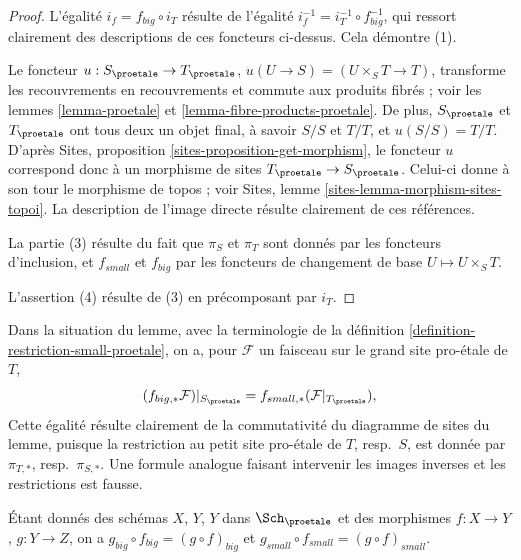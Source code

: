 \begin{proof}
L'égalité $i_f = f_{big} \circ i_T$ résulte de
l'égalité $i_f^{-1} = i_T^{-1} \circ f_{big}^{-1}$, qui ressort
clairement des descriptions de ces foncteurs ci-dessus.
Cela démontre (1).

\medskip\noindent
Le foncteur $u : S_\proetale \to T_\proetale$,
$u(U \to S) = (U \times_S T \to T)$,
transforme les recouvrements en recouvrements et commute aux produits fibrés ;
voir les lemmes \ref{lemma-proetale} et \ref{lemma-fibre-products-proetale}.
De plus, $S_\proetale$ et $T_\proetale$ ont tous deux un objet final,
à savoir $S/S$ et $T/T$, et $u(S/S) = T/T$. D'après
Sites, proposition \ref{sites-proposition-get-morphism},
le foncteur $u$ correspond donc à un morphisme de sites
$T_\proetale \to S_\proetale$. Celui-ci donne à son tour le
morphisme de topos ; voir
Sites, lemme \ref{sites-lemma-morphism-sites-topoi}. La description
de l'image directe résulte clairement de ces références.

\medskip\noindent
La partie (3) résulte du fait que $\pi_S$ et $\pi_T$ sont donnés par les
foncteurs d'inclusion, et $f_{small}$ et $f_{big}$ par les
foncteurs de changement de base $U \mapsto U \times_S T$.

\medskip\noindent
L'assertion (4) résulte de (3) en précomposant par $i_T$.
\end{proof}

\noindent
Dans la situation du lemme, avec la terminologie de la
définition \ref{definition-restriction-small-proetale},
on a, pour $\mathcal{F}$ un faisceau sur le grand site pro-\'etale de $T$,
\begin{equation}
\label{equation-compare-big-small}
(f_{big, *}\mathcal{F})|_{S_\proetale} =
f_{small, *}(\mathcal{F}|_{T_\proetale}),
\end{equation}
Cette égalité résulte clairement de la commutativité du diagramme de
sites du lemme, puisque la restriction au petit site pro-\'etale de
$T$, resp.\ $S$, est donnée par $\pi_{T, *}$, resp.\ $\pi_{S, *}$. Une formule
analogue faisant intervenir les images inverses et les restrictions est fausse.

\begin{lemma}
\label{lemma-composition-proetale}
Étant donnés des schémas $X$, $Y$, $Y$ dans $\Sch_\proetale$
et des morphismes $f : X \to Y$, $g : Y \to Z$, on a
$g_{big} \circ f_{big} = (g \circ f)_{big}$ et
$g_{small} \circ f_{small} = (g \circ f)_{small}$.
\end{lemma}

